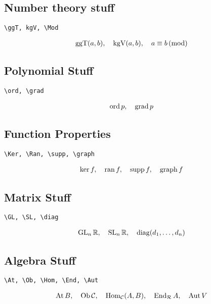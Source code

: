 \documentclass{article}
\begin{document}
\subsection{Number theory stuff}

\verb|\ggT, kgV, \Mod|

\begin{align*}
    \operatorname{ggT} (a, b),
    \quad
    \operatorname{kgV} (a, b),
    \quad
    a \equiv b \, (\operatorname{mod})
\end{align*}

\subsection{Polynomial Stuff}

\verb|\ord, \grad|

\begin{align*}
    \operatorname{ord} p,
    \quad
    \operatorname{grad} p
\end{align*}

\subsection{Function Properties}

\verb|\Ker, \Ran, \supp, \graph|

\begin{align*}
    \operatorname{ker} f,
    \quad
    \operatorname{ran} f,
    \quad
    \operatorname{supp} f,
    \quad
    \operatorname{graph} f
\end{align*}

\subsection{Matrix Stuff}

\verb|\GL, \SL, \diag|

\begin{align*}
    \operatorname{GL}_n \mathbb{R},
    \quad
    \operatorname{SL}_n \mathbb{R},
    \quad
    \operatorname{diag} (d_1, \dots, d_n)
\end{align*}

\subsection{Algebra Stuff}

\verb|\At, \Ob, \Hom, \End, \Aut|

\begin{align*}
    \operatorname{At} B,
    \quad
    \operatorname{Ob} \mathcal{C},
    \quad
    \operatorname{Hom}_{\mathcal{C}} (A, B),
    \quad
    \operatorname{End}_{\mathcal{R}} A,
    \quad
    \operatorname{Aut} V
\end{align*}
\end{document}
